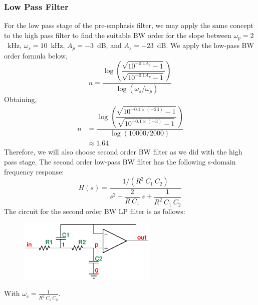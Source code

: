 \documentclass[a4paper]{IEEEtran}
\newcommand{\inv}[1]{\dfrac{1}{#1}}
\begin{document}
			\subsubsection{Low Pass Filter}
				For the low pass stage of the pre-emphasis filter, we may apply the same concept to the high pass filter to find the suitable BW order for the slope between $\omega_p=2$~kHz, $\omega_s=10$~kHz, $A_p=-3$~dB, and $A_s=-23$~dB. We apply the low-pass BW order formula below, 
				\begin{equation}
					\label{spec:lp:eq:n}
						n=\dfrac{
							\log{\left(
								\dfrac{
									\sqrt{10^{-0.1A_s}-1}
								}{
									\sqrt{10^{-0.1A_p}-1}
								}
							\right)}}{
							\log{
								(\omega_s / \omega_p)
							}
						}
				\end{equation}
				Obtaining,
				\begin{align*}
					n&=\dfrac{
						\log{\left(
							\dfrac{
								\sqrt{10^{-0.1\times (-23)}-1}
							}{
								\sqrt{10^{-0.1\times (-3)}-1}
							}
						\right)}}{
						\log{
							(10000 / 2000)
						}
					} \\
					&\approx 1.64
				\end{align*}
				Therefore, we will also choose second order BW filter as we did with the high pass stage. The second order low-pass BW filter has the following s-domain frequency response:
				\begin{equation}
					\label{spec:bw:lp:n2}
					H(s)=\dfrac{1/(R^2~C_1~C_2)}{s^2+\dfrac{2}{R~C_1}~s+\inv{R^2~C_1~C_2}}
				\end{equation}
				The circuit for the second order BW LP filter is as follows:
				\begin{figure}[h!]
					\begin{center}
						\includegraphics[width=250px]{lp.eps}
					\end{center}
				\end{figure}
				
				With $\omega_c = \tfrac{1}{R^2~C_1~C_2}$.
\end{document}
